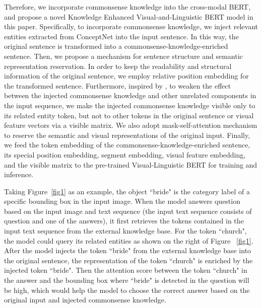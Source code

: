\documentclass[conference]{IEEEtran}
\begin{document}
Therefore, we incorporate commonsense knowledge into the cross-modal BERT, and propose a novel Knowledge Enhanced Visual-and-Linguistic BERT model in this paper. Specifically, to incorporate commonsense knowledge, we inject relevant entities extracted from ConceptNet \cite{b36} into the input sentence. In this way, the original sentence is transformed into a commonsense-knowledge-enriched sentence. Then, we propose a mechanism for sentence structure and semantic representation reservation. In order to keep the readability and structural information of the original sentence, we employ relative position embedding for the transformed sentence. Furthermore, inspired by \cite{b16}, to weaken the effect between the injected commonsense knowledge and other unrelated components in the input sequence,  we make the injected commonsense knowledge visible only to its related entity token, but not to other tokens in the original sentence or visual feature vectors via a visible matrix. We also adopt mask-self-attention mechanism to reserve the semantic and visual representations of the original input. Finally, we feed the token embedding of the commonsense-knowledge-enriched sentence, its special position embedding,  segment embedding, visual feature embedding, and the visible matrix to the pre-trained Visual-Linguistic BERT \cite{b14} for training and inference. 



Taking Figure~\ref{fig1} as an example, the object “bride" is the category label of a specific bounding box in the input image. When the model answers question based on the input image and text sequence (the input text sequence consists of question and one of the answers), it first retrieves the tokens contained in the input text sequence from the external knowledge base. For the token “church", the model could query its related entities as shown on the right of Figure ~\ref{fig1}. After the model injects the token “bride" from the external knowledge base into the original sentence, the representation of the token “church" is enriched by the injected token “bride". Then the attention score between the token “church" in the answer and the bounding box where “bride" is detected in the question will be high, which would help the model to choose the correct answer based on the original input and injected commonsense knowledge. 
\end{document}
